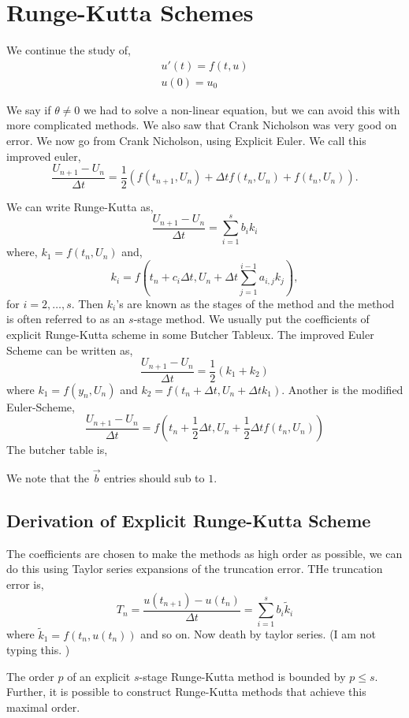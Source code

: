 
\section{Runge-Kutta Schemes}
We continue the study of,
\begin{align*}
  u'(t) = f(t, u) \\
  u(0) = u_0
\end{align*}

\noindent
We say if $\theta \ne 0$ we had to solve a non-linear equation, but we can avoid this with more complicated methods. We also saw that Crank Nicholson was very good on error. We now go from Crank Nicholson, using Explicit Euler. We call this improved euler,
$$ \frac{U_{n+1} - U_n}{\Delta t} = \frac{1}{2}(f(t_{n+1}, U_{n}) + \Delta t f(t_n, U_n) + f(t_n, U_n)). $$

\noindent
We can write Runge-Kutta as,
$$ \frac{U_{n+1} - U_n}{\Delta t} = \sum_{i=1}^s b_ik_i $$
where, $k_1 = f(t_n, U_n)$ and,
$$ k_i = f\left(t_n + c_i\Delta t, U_n + \Delta t \sum_{j=1}^{i-1} a_{i, j} k_j\right), $$
for $i = 2, \dots, s$. Then $k_i$'s are known as the stages of the method and the method is often referred to as an $s$-stage method. We usually put the coefficients of explicit Runge-Kutta scheme in some Butcher Tableux.
The improved Euler Scheme can be written as,
$$ \frac{U_{n+1} - U_n}{\Delta t} = \frac{1}{2}(k_1 + k_2) $$
where $k_1 = f(y_n, U_n)$ and $k_2 = f(t_n + \Delta t, U_n + \Delta tk_1)$. Another is the modified Euler-Scheme,
$$ \frac{U_{n+1} - U_n}{\Delta t} = f(t_n + \frac{1}{2}\Delta t, U_n + \frac{1}{2}\Delta t f(t_n, U_n)) $$
The butcher table is,
\noindent
\begin{remark}
   We note that the $\vec b$ entries should sub to $1$.
\end{remark}

\subsection{Derivation of Explicit Runge-Kutta Scheme}
The coefficients are chosen to make the methods as high order as possible, we can do this using Taylor series expansions of the truncation error. THe truncation error is,
$$ T_n = \frac{u(t_{n+1}) - u(t_n)}{\Delta t} = \sum_{i=1}^s b_i \tilde k_i $$
where $\tilde k_1 = f(t_n, u(t_n))$ and so on. Now death by taylor series. (I am not typing this. )
\begin{nthm}
  The order $p$ of an explicit $s$-stage Runge-Kutta method is bounded by $p \le s$. Further, it is possible to construct Runge-Kutta methods that achieve this maximal order.
\end{nthm}

